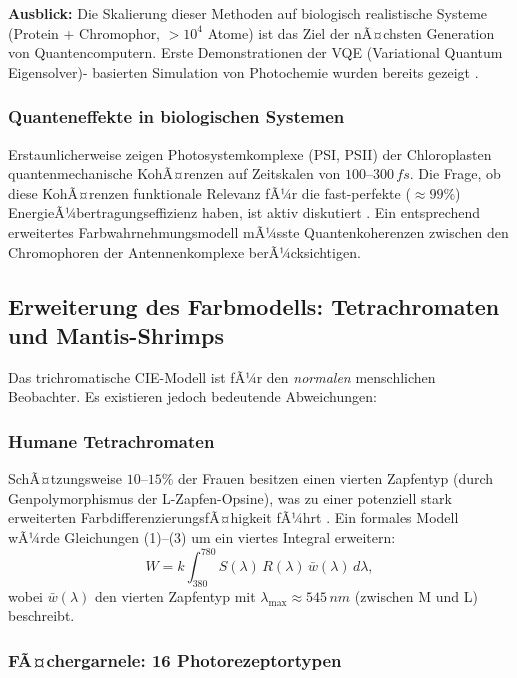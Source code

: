 ﻿\documentclass[a4paper,12pt]{article}
\theoremstyle{definition}
\begin{document}
\textbf{Ausblick:} Die Skalierung dieser Methoden auf biologisch realistische Systeme
(Protein + Chromophor, $> 10^4$ Atome) ist das Ziel der nÃ¤chsten Generation von
Quantencomputern. Erste Demonstrationen der VQE (Variational Quantum Eigensolver)-
basierten Simulation von Photochemie wurden bereits gezeigt \cite{google2020}.

\subsubsection{Quanteneffekte in biologischen Systemen}

Erstaunlicherweise zeigen Photosystemkomplexe (PSI, PSII) der Chloroplasten
quantenmechanische KohÃ¤renzen auf Zeitskalen von $100$--$300\,\si{fs}$.
Die Frage, ob diese KohÃ¤renzen funktionale Relevanz fÃ¼r die fast-perfekte
($\approx 99\%$) EnergieÃ¼bertragungseffizienz haben, ist aktiv diskutiert
\cite{engel2007}. Ein entsprechend erweitertes Farbwahrnehmungsmodell
mÃ¼sste Quantenkoherenzen zwischen den Chromophoren der Antennenkomplexe
berÃ¼cksichtigen.

\subsection{Erweiterung des Farbmodells: Tetrachromaten und Mantis-Shrimps}

Das trichromatische CIE-Modell ist fÃ¼r den \emph{normalen} menschlichen Beobachter.
Es existieren jedoch bedeutende Abweichungen:

\subsubsection{Humane Tetrachromaten}

SchÃ¤tzungsweise $10$--$15\%$ der Frauen besitzen einen vierten Zapfentyp
(durch Genpolymorphismus der L-Zapfen-Opsine), was zu einer potenziell
stark erweiterten FarbdifferenzierungsfÃ¤higkeit fÃ¼hrt \cite{jordan2010}.
Ein formales Modell wÃ¼rde Gleichungen (1)--(3) um ein viertes Integral erweitern:
\[
  W = k \int_{380}^{780} S(\lambda)\,R(\lambda)\,\bar{w}(\lambda)\,d\lambda,
\]
wobei $\bar{w}(\lambda)$ den vierten Zapfentyp mit $\lambda_{\max} \approx 545\,\si{nm}$
(zwischen M und L) beschreibt.

\subsubsection{FÃ¤chergarnele: 16 Photorezeptortypen}
\end{document}

